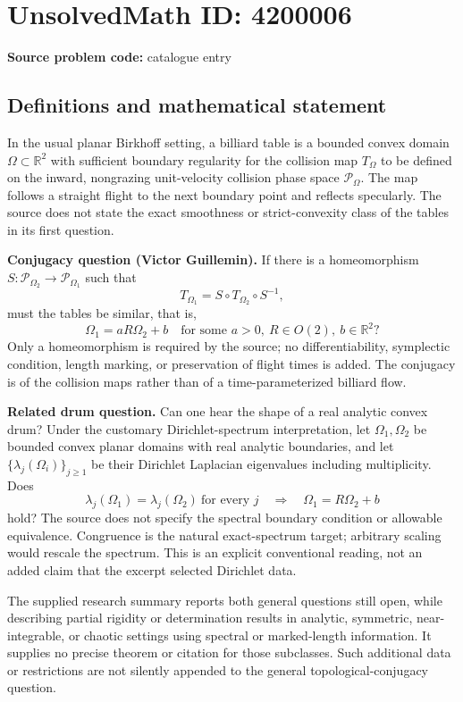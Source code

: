 \documentclass[11pt]{article}
\newcommand{\R}{\mathbb{R}}
\begin{document}
\section*{UnsolvedMath ID: 4200006}
\textbf{Source problem code:} catalogue entry
\subsection{Definitions and mathematical statement}
In the usual planar Birkhoff setting, a billiard table is a bounded convex domain $\Omega\subset\R^2$ with sufficient boundary regularity for the collision map $T_\Omega$ to be defined on the inward, nongrazing unit-velocity collision phase space $\mathcal P_\Omega$. The map follows a straight flight to the next boundary point and reflects specularly. The source does not state the exact smoothness or strict-convexity class of the tables in its first question.

\textbf{Conjugacy question (Victor Guillemin).} If there is a homeomorphism $S:\mathcal P_{\Omega_2}\to\mathcal P_{\Omega_1}$ such that
\[
 T_{\Omega_1}=S\circ T_{\Omega_2}\circ S^{-1},
\]
must the tables be similar, that is,
\[
 \Omega_1=aR\Omega_2+b
 \quad\text{for some }a>0,\ R\in O(2),\ b\in\R^2?
\]
Only a homeomorphism is required by the source; no differentiability, symplectic condition, length marking, or preservation of flight times is added. The conjugacy is of the collision maps rather than of a time-parameterized billiard flow.

\textbf{Related drum question.} Can one hear the shape of a real analytic convex drum? Under the customary Dirichlet-spectrum interpretation, let $\Omega_1,\Omega_2$ be bounded convex planar domains with real analytic boundaries, and let $\{\lambda_j(\Omega_i)\}_{j\geq1}$ be their Dirichlet Laplacian eigenvalues including multiplicity. Does
\[
 \lambda_j(\Omega_1)=\lambda_j(\Omega_2)\ \text{for every }j
 \quad\Longrightarrow\quad
 \Omega_1=R\Omega_2+b
\]
hold? The source does not specify the spectral boundary condition or allowable equivalence. Congruence is the natural exact-spectrum target; arbitrary scaling would rescale the spectrum. This is an explicit conventional reading, not an added claim that the excerpt selected Dirichlet data.

The supplied research summary reports both general questions still open, while describing partial rigidity or determination results in analytic, symmetric, near-integrable, or chaotic settings using spectral or marked-length information. It supplies no precise theorem or citation for those subclasses. Such additional data or restrictions are not silently appended to the general topological-conjugacy question.
\end{document}
